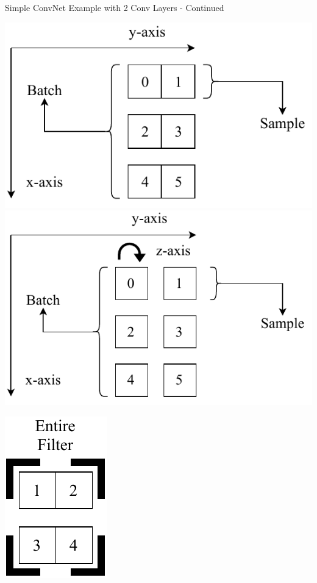 \documentclass{beamer}
\begin{document}
		\begin{frame}{Simple ConvNet Example with 2 Conv Layers - Continued}
			\begin{center}
				\includegraphics[height=0.35\textheight]{input_final}\hfill
				\includegraphics[height=0.35\textheight]{input_reshaped}
			\end{center}
			\begin{center}
				\includegraphics[height=0.3\textheight]{filter1}
			\end{center}
		\end{frame}
\end{document}

